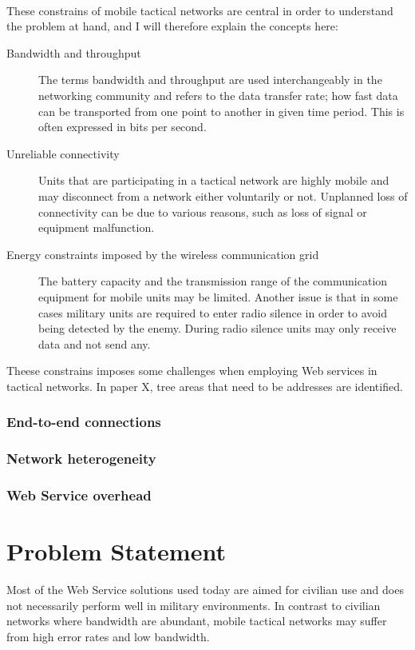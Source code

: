 \documentclass[USenglish]{article}
\begin{document}
\paragraph{}
These constrains of mobile tactical networks are central in order to understand the problem at hand, and I will therefore explain the concepts here:

\begin{description}
\item[Bandwidth and throughput] The terms bandwidth and throughput are used interchangeably in the networking community and refers to the data transfer rate; how fast data can be transported from one point to another in given time period. This is often expressed in bits per second.
\item[Unreliable connectivity] Units that are participating in a tactical network are highly mobile and may disconnect from a network either voluntarily or not. Unplanned loss of connectivity can be due to various reasons, such as loss of signal or equipment malfunction.
\item[Energy constraints imposed by the wireless communication grid] The battery capacity and the transmission range of the communication equipment for mobile units may be limited. Another issue is that in some cases military units are required to enter radio silence in order to avoid being detected by the enemy. During radio silence units may only receive data and not send any.
\end{description}

Theese constrains imposes some challenges when employing Web services in tactical networks. In paper X, tree areas that need to be addresses are identified\cite{IST-118}.

\subsubsection{End-to-end connections}
\subsubsection{Network heterogeneity}
\subsubsection{Web Service overhead}

\section{Problem Statement}
Most of the Web Service solutions used today are aimed for civilian use and does
not necessarily perform well in military environments. In contrast to civilian
networks where bandwidth are abundant, mobile tactical networks may suffer
from high error rates and low bandwidth.
\end{document}
